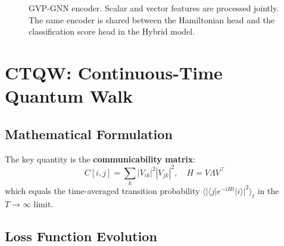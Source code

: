 \documentclass[11pt,a4paper]{article}
\begin{document}
\begin{figure}[H]
\caption{GVP-GNN encoder. Scalar and vector features are processed jointly.
The same encoder is shared between the Hamiltonian head and the classification
score head in the Hybrid model.}
\end{figure}

\section{CTQW: Continuous-Time Quantum Walk}

\subsection{Mathematical Formulation}

The key quantity is the \textbf{communicability matrix}:
\begin{equation}
  C[i,j] = \sum_k |V_{ik}|^2 |V_{jk}|^2, \quad H = V\Lambda V^\top
\end{equation}
which equals the time-averaged transition probability
$\langle |\langle j | e^{-iHt} | i \rangle|^2 \rangle_t$ in the $T\to\infty$ limit.

\subsection{Loss Function Evolution}
\end{document}
